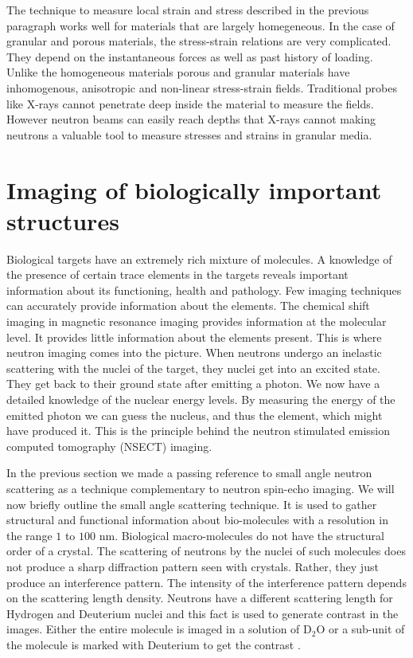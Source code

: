 \documentclass{article}
\numberwithin{equation}{section}
\begin{document}
The technique to measure local strain and stress described in the previous
paragraph works well for materials that are largely homegeneous. In the case
of granular and porous materials, the stress-strain relations are very 
complicated. They depend on the instantaneous forces as well as past history
of loading. Unlike the homogeneous materials porous and granular materials 
have inhomogenous, anisotropic and non-linear stress-strain fields. Traditional
probes like X-rays cannot penetrate deep inside the material to measure the
fields. However neutron beams can easily reach depths that X-rays cannot making
neutrons a valuable tool to measure stresses and strains in granular media.

\section{Imaging of biologically important structures}\label{s14}
Biological targets have an extremely rich mixture of molecules. A knowledge of
the presence of certain trace elements in the targets reveals important 
information about its functioning, health and pathology. Few imaging techniques
can accurately provide information about the elements. The chemical shift 
imaging in magnetic resonance imaging provides information at the molecular
level. It provides little information about the elements present. This is where
neutron imaging comes into the picture. When neutrons undergo an inelastic
scattering with the nuclei of the target, they nuclei get into an excited
state. They get back to their ground state after emitting a photon. We now 
have a detailed knowledge of the nuclear energy levels. By measuring the energy
of the emitted photon we can guess the nucleus, and thus the element, which
might have produced it. This is the principle behind the neutron stimulated
emission computed tomography (NSECT) imaging.

In the previous section we made a passing reference to small angle neutron
scattering as a technique complementary to neutron spin-echo imaging. We will
now briefly outline the small angle scattering technique. It is used to gather
structural and functional information about bio-molecules with a resolution
in the range $1$ to $100$ nm. Biological macro-molecules do not have the
structural order of a crystal. The scattering of neutrons by the nuclei of 
such molecules does not produce a sharp diffraction pattern seen with crystals.
Rather, they just produce an interference pattern. The intensity of the 
interference pattern depends on the scattering length density. Neutrons have
a different scattering length for Hydrogen and Deuterium nuclei and this fact
is used to generate contrast in the images. Either the entire molecule is 
imaged in a solution of D${}_2$O or a sub-unit of the molecule is marked with
Deuterium to get the contrast \cite{anderson2008neutron}.
\end{document}
